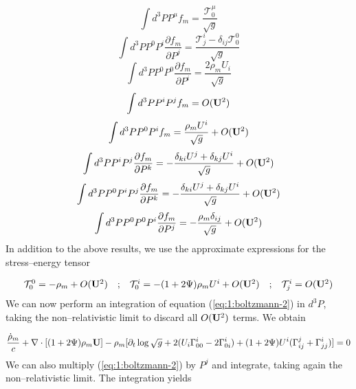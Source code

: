 \begin{equation}
\label{eq:1:boltzmann-mom-1}
\int d^3P P^\mu f_m = \frac{\mathcal{T}^\mu_0}{\sqrt{g}}
\end{equation}
%
\begin{equation}
\label{eq:1:boltzmann-mom-2}
\int d^3P P^0 P^i \frac{\partial f_m}{\partial P^j} = \frac{\mathcal{T}^i_j-\delta_{ij}\mathcal{T}^0_0}{\sqrt{g}}
\end{equation}
%
\begin{equation}
\label{eq:1:boltzmann-mom-3}
\int d^3P P^0P^0 \frac{\partial f_m}{\partial P^i} = \frac{2\rho_m U_i}{\sqrt{g}}
\end{equation}
%
\begin{equation}
\label{eq:1:boltzmann-mom-4}
\int d^3P P^iP^j f_m =  O(\mathbf{U}^2)
\end{equation}
%
\begin{equation}
\label{eq:1:boltzmann-mom-5}
\int d^3P P^0P^i f_m = \frac{\rho_mU^i}{\sqrt{g}} + O(\mathbf{U}^2)
\end{equation}
%
\begin{equation}
\label{eq:1:boltzmann-mom-6}
\int d^3P P^iP^j \frac{\partial f_m}{\partial P^k} = -\frac{\delta_{ki}U^j + \delta_{kj}U^i}{\sqrt{g}} + O(\mathbf{U}^2)
\end{equation}
%
\begin{equation}
\label{eq:1:boltzmann-mom-7}
\int d^3P P^0P^iP^j \frac{\partial f_m}{\partial P^k} = -\frac{\delta_{ki}U^j + \delta_{kj}U^i}{\sqrt{g}} + O(\mathbf{U}^2)
\end{equation}
%
\begin{equation}
\label{eq:1:boltzmann-mom-8}
\int d^3P P^0P^0P^i \frac{\partial f_m}{\partial P^j} = -\frac{\rho_m\delta_{ij}}{\sqrt{g}} + O(\mathbf{U}^2)
\end{equation}
%
In addition to the above results, we  use the approximate expressions for the stress--energy tensor 

\begin{equation}
\label{eq:1:stress-energy-nr}
\begin{matrix}
\mathcal{T}^0_0 = -\rho_m + O(\mathbf{U}^2) & ; & \mathcal{T}^i_0 = -(1+2\Psi)\rho_m U^i + O(\mathbf{U}^2)  & ; & \mathcal{T}^i_j = O(\mathbf{U}^2)
\end{matrix}
\end{equation}
%
We can now perform an integration of equation (\ref{eq:1:boltzmann-2}) in $d^3P$, taking the non--relativistic limit to discard all $O(\mathbf{U}^2)$ terms. We obtain

\begin{equation}
\label{eq:1:b-monopole}
\frac{\dot{\rho}_m}{c} + \nabla\cdot[(1+2\Psi)\rho_m\mathbf{U}] - \rho_m[\partial_t\log \sqrt{g} +  2(U_i\Gamma^i_{00} - 2\Gamma^i_{0i}) + (1+2\Psi)U^i(\Gamma_{ij}^j+\Gamma^i_{jj})] = 0
\end{equation}
%
We can also multiply (\ref{eq:1:boltzmann-2}) by $P^j$ and integrate, taking again the non--relativistic limit. The integration yields 

